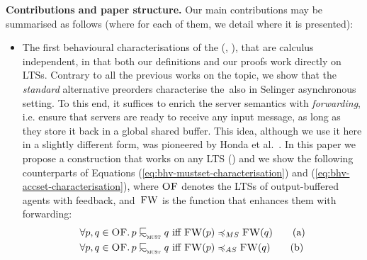 {\bfseries Contributions and paper structure.} Our main contributions
may be summarised as follows
  (where for each of them, we detail where it is presented):
\begin{itemize}
\item 
The first behavioural
characterisations of the \mustpreorder (,
), that are {calculus independent}, in
that both our definitions and our proofs work directly on LTSs.
Contrary to all the previous works on the topic, we show that the {\em
  standard} alternative preorders characterise the~\mustpreorder also
in Selinger asynchronous setting.  To this end, it suffices to
enrich the server semantics with {\em forwarding}, i.e. ensure that
servers are ready to receive any input message, as long as they store
it back in a global shared buffer. This idea, although we use it here in a slightly
different form, was pioneered by Honda et al.~\cite{DBLP:conf/ecoop/HondaT91}.
In this paper we propose a construction that works on any LTS ()
and we show the following counterparts of Equations
(\ref{eq:bhv-mustset-characterisation}) and
(\ref{eq:bhv-accset-characterisation}),
where $\textsc{OF}$ denotes the LTSs of output-buffered agents with
  feedback, and~$\textsc{FW}$ is the function that enhances them with forwarding:
\begin{align}
  \forall \serverA , \serverB \in \obaFB
    \wehavethat&
    \serverA \testleqS \serverB
    \text{ iff }
    \liftFW{\serverA} \msleq \liftFW{\serverB}
    \tag{a}
    \\
\forall \serverA , \serverB \in \obaFB
    \wehavethat&
    \serverA \testleqS \serverB
    \text{ iff }
    \liftFW{\serverA} \asleq \liftFW{\serverB}
    \tag{b}
\end{align}

  

\end{itemize}
